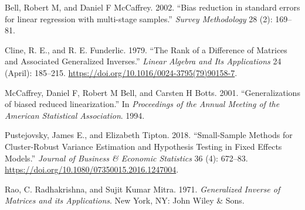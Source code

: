 \documentclass[12pt]{article}
\newlength{\cslhangindent}
\newlength{\cslentryspacingunit} %
\newenvironment{CSLReferences}[2] %
 {%
  \setlength{\parindent}{0pt}
  \ifodd #1
  \let\oldpar\par
  \def\par{\hangindent=\cslhangindent\oldpar}
  \fi
  \setlength{\parskip}{#2\cslentryspacingunit}
 }%
 {}
\begin{document}
\hypertarget{refs}{}
\begin{CSLReferences}{1}{0}
\leavevmode{}%
Bell, Robert M, and Daniel F McCaffrey. 2002. {``{Bias reduction in
standard errors for linear regression with multi-stage samples}.''}
\emph{Survey Methodology} 28 (2): 169--81.

\leavevmode{}%
Cline, R. E., and R. E. Funderlic. 1979. {``The Rank of a Difference of
Matrices and Associated Generalized Inverses.''} \emph{Linear Algebra
and Its Applications} 24 (April): 185--215.
\url{https://doi.org/10.1016/0024-3795(79)90158-7}.

\leavevmode{}%
McCaffrey, Daniel F, Robert M Bell, and Carsten H Botts. 2001.
{``{Generalizations of biased reduced linearization}.''} In
\emph{Proceedings of the Annual Meeting of the American Statistical
Association}. 1994.

\leavevmode{}%
Pustejovsky, James E., and Elizabeth Tipton. 2018. {``Small-Sample
Methods for Cluster-Robust Variance Estimation and Hypothesis Testing in
Fixed Effects Models.''} \emph{Journal of Business \& Economic
Statistics} 36 (4): 672--83.
\url{https://doi.org/10.1080/07350015.2016.1247004}.

\leavevmode{}%
Rao, C. Radhakrishna, and Sujit Kumar Mitra. 1971. \emph{{Generalized
Inverse of Matrices and its Applications}}. New York, NY: John Wiley \&
Sons.

\end{CSLReferences}



\end{document}
